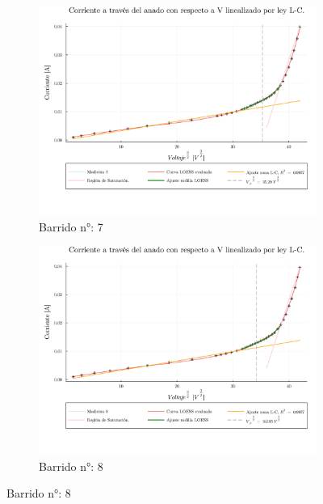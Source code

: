 \begin{figure}[H]
	\ContinuedFloat %
	\centering
	\begin{subfigure}[b]{0.49\textwidth}
		\centering
		\includegraphics[width=\linewidth]{img/pot7.png}
		\caption{Barrido n°: 7}
		\label{fig:pot7}
	\end{subfigure}
	\hfill
	\begin{subfigure}[b]{0.49\textwidth}
		\centering
		\includegraphics[width=\linewidth]{img/pot8.png}
		\caption{Barrido n°: 8}
		\label{fig:pot8}
	\end{subfigure}
\end{figure}



